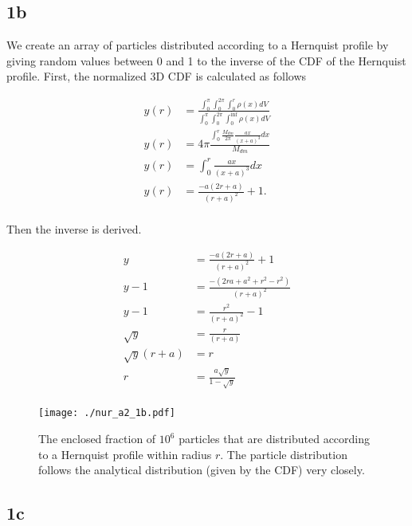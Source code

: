 

\newpage

\subsection{1b}



We create an array of particles distributed according to a Hernquist profile by giving random values between 0 and 1 to the inverse of the CDF of the Hernquist profile. First, the normalized 3D CDF is calculated as follows

\begin{align*}
    y(r) & = \frac{\int^{\pi}_{0}\int^{2\pi}_{0}\int^{r}_{0} \rho (x) dV}{\int^{\pi}_{0}\int^{2\pi}_{0}\int^{\inf}_{0} \rho (x) dV} \\
    y(r) & = 4 \pi \frac{\int^{r}_{0} \frac{M_{dm}}{2 \pi} \frac{ax}{(x + a)^{3}} dx}{M_{dm}} \\
    y(r) & = \int^{r}_{0} \frac{ax}{(x + a)^{3}} dx \\
    y(r) & = \frac{-a(2r +a)}{(r+a)^{2}} + 1.\\
\end{align*}

Then the inverse is derived.

\begin{align*}
    y & = \frac{-a(2r +a)}{(r+a)^{2}} + 1 \\
    y - 1 & = \frac{-(2ra + a^{2} + r^{2} - r^{2})}{(r+a)^{2}} \\
    y - 1 & = \frac{r^{2}}{(r+a)^{2}} - 1 \\
    \sqrt{y} & = \frac{r}{(r+a)} \\
    \sqrt{y}(r+a) & = r \\
    r & = \frac{a \sqrt{y}}{1 - \sqrt{y}} \\
\end{align*}

\begin{figure}[!ht]
  \centering
  \texttt{[image: ./nur\_a2\_1b.pdf]}
  \caption{The enclosed fraction of $10^{6}$ particles that are distributed according to a Hernquist profile within radius $r$. The particle distribution follows the analytical distribution (given by the CDF) very closely.}
  \label{fig:1b}
\end{figure}

\newpage

\subsection{1c}

